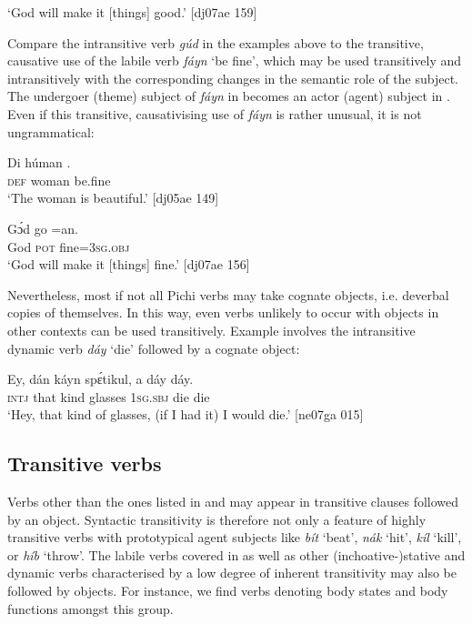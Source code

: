 \glt ‘God will make it [things] good.’ [dj07ae 159]
\z

Compare the intransitive verb \textit{gúd} in the examples above to the transitive, causative use of the labile verb \textit{fáyn} ‘be fine’, which may be used transitively and intransitively with the corresponding changes in the semantic role of the subject. The undergoer (theme) subject of \textit{fáyn} in  becomes an actor (agent) subject in . Even if this transitive, causativising use of \textit{fáyn} is rather unusual, it is not ungrammatical: 


\ea%
    \label{ex:key:1098}
    \gll Di  húman  .\\
\textsc{def}  woman  be.fine\\

\glt ‘The woman is beautiful.’ [dj05ae 149]
\z


\ea%
    \label{ex:key:1099}
    \gll Gɔ́d    go  =an.\\
God    \textsc{pot}  fine=\textsc{3sg.obj}\\

\glt ‘God will make it [things] fine.’ [dj07ae 156]
\z

Nevertheless, most if not all Pichi verbs may take cognate objects, i.e. deverbal copies of themselves. In this way, even verbs unlikely to occur with objects in other contexts can be used transitively. Example  involves the intransitive dynamic verb \textit{dáy} ‘die’ followed by a cognate object: 


\ea%
    \label{ex:key:1100}
    \gll Ey,  dán  káyn  spɛ́tikul,  a    dáy  dáy.\\
\textsc{intj}  that  kind    glasses  \textsc{1sg.sbj}  die  die\\

\glt ‘Hey, that kind of glasses, (if I had it) I would die.’ [ne07ga 015]
\z

\subsection{Transitive verbs}

Verbs other than the ones listed in  and  may appear in transitive clauses followed by an object. Syntactic transitivity is therefore not only a feature of highly transitive verbs with prototypical agent subjects like \textit{bít} ‘beat’, \textit{nák} ‘hit’, \textit{kíl} ‘kill’, or \textit{híb} ‘throw’. The labile verbs covered in  as well as other (inchoative-)stative and dynamic verbs characterised by a low degree of inherent transitivity may also be followed by objects. For instance, we find verbs denoting body states and body functions amongst this group.


